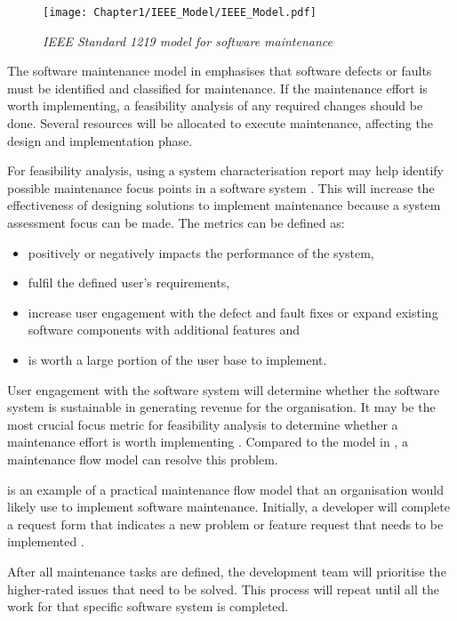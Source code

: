 \begin{figure}[!htb]
	\centering %
	\texttt{[image: Chapter1/IEEE\_Model/IEEE\_Model.pdf]}
	\caption[IEEE Standard 1219 model for software maintenance]
	{\textit{IEEE Standard 1219 model for software maintenance \cite{Ren2011}}} \label{fig:ch1_ieeeModel}
\end{figure}

The software maintenance model in  emphasises that software defects or faults must be identified and classified for maintenance. If the maintenance effort is worth implementing, a feasibility analysis of any required changes should be done. Several resources will be allocated to execute maintenance, affecting the design and implementation phase.\par For feasibility analysis, using a system characterisation report may help identify possible maintenance focus points in a software system \cite{Araujo2021}. This will increase the effectiveness of designing solutions to implement maintenance because a system assessment focus can be made. The metrics can be defined as:

\begin{itemize}
	\item positively or negatively impacts the performance of the system,
	\item fulfil the defined user's requirements,
	\item increase user engagement with the defect and fault fixes or expand existing software components with additional features and
	\item is worth a large portion of the user base to implement.
\end{itemize}

User engagement with the software system will determine whether the software system is sustainable in generating revenue for the organisation. It may be the most crucial focus metric for feasibility analysis to determine whether a maintenance effort is worth implementing \cite{Araujo2021}. Compared to the model in , a maintenance flow model can resolve this problem.  

 is an example of a practical maintenance flow model that an organisation would likely use to implement software maintenance. Initially, a developer will complete a request form that indicates a new problem or feature request that needs to be implemented \cite{Tang2010}. 

\par After all maintenance tasks are defined, the development team will prioritise the higher-rated issues that need to be solved. This process will repeat until all the work for that specific software system is completed. 

